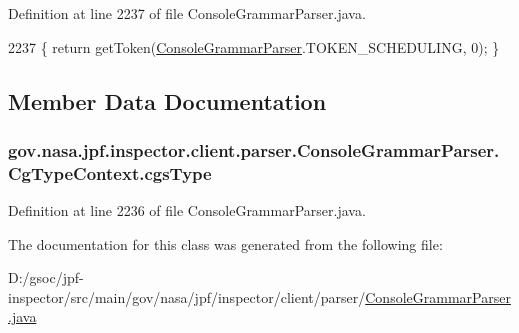 Definition at line 2237 of file Console\+Grammar\+Parser.\+java.


\begin{DoxyCode}
2237 \{ \textcolor{keywordflow}{return} getToken(\hyperlink{classgov_1_1nasa_1_1jpf_1_1inspector_1_1client_1_1parser_1_1_console_grammar_parser_a03e28f396e991cff9d014f357ae220f3}{ConsoleGrammarParser}.TOKEN\_SCHEDULING, 0); \}
\end{DoxyCode}


\subsection{Member Data Documentation}
\subsubsection[{\texorpdfstring{cgs\+Type}{cgsType}}]{ gov.\+nasa.\+jpf.\+inspector.\+client.\+parser.\+Console\+Grammar\+Parser.\+Cg\+Type\+Context.\+cgs\+Type}\hypertarget{classgov_1_1nasa_1_1jpf_1_1inspector_1_1client_1_1parser_1_1_console_grammar_parser_1_1_cg_type_context_aa1a25cd52c6c04c66fdcbec895482f56}{}\label{classgov_1_1nasa_1_1jpf_1_1inspector_1_1client_1_1parser_1_1_console_grammar_parser_1_1_cg_type_context_aa1a25cd52c6c04c66fdcbec895482f56}


Definition at line 2236 of file Console\+Grammar\+Parser.\+java.



The documentation for this class was generated from the following file\+:\begin{DoxyCompactItemize}
\item 
D\+:/gsoc/jpf-\/inspector/src/main/gov/nasa/jpf/inspector/client/parser/\hyperlink{_console_grammar_parser_8java}{Console\+Grammar\+Parser.\+java}\end{DoxyCompactItemize}
